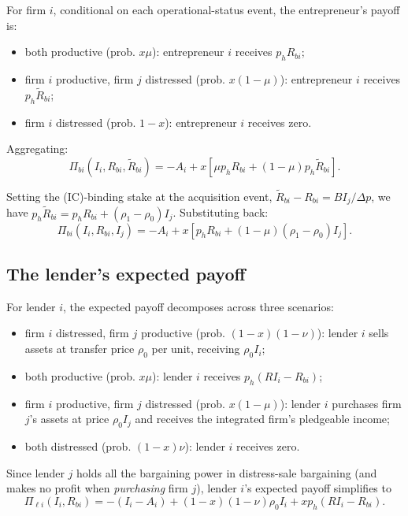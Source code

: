 \documentclass[11pt,a4paper,oneside]{book}
\theoremstyle{plain}
\theoremstyle{definition}
\theoremstyle{remark}
\numberwithin{equation}{chapter}
\begin{document}
For firm $i$, conditional on each operational-status event, the entrepreneur's payoff is:
\begin{itemize}
  \item both productive (prob. $x \mu$): entrepreneur $i$ receives $p_h R_{b i}$;
  \item firm $i$ productive, firm $j$ distressed (prob. $x(1 - \mu)$): entrepreneur $i$ receives $p_h \widetilde{R}_{b i}$;
  \item firm $i$ distressed (prob. $1 - x$): entrepreneur $i$ receives zero.
\end{itemize}
Aggregating:
\begin{equation}\label{eq:ma-Pi-b-raw}
  \Pi_{b i}(I_i, R_{b i}, \widetilde{R}_{b i}) = -A_i + x \left[\mu p_h R_{b i} + (1 - \mu) p_h \widetilde{R}_{b i}\right].
\end{equation}

Setting the (IC)-binding stake at the acquisition event, $\widetilde{R}_{b i} - R_{b i} = B I_j/\Delta p$, we have $p_h \widetilde{R}_{b i} = p_h R_{b i} + (\rho_1 - \rho_0) I_j$.
Substituting back:
\begin{equation}\label{eq:ma-Pi-b}
  \Pi_{b i}(I_i, R_{b i}, I_j) = -A_i + x \left[ p_h R_{b i} + (1 - \mu)(\rho_1 - \rho_0) I_j \right].
\end{equation}

\subsection{The lender's expected payoff}

For lender $i$, the expected payoff decomposes across three scenarios:
\begin{itemize}
  \item firm $i$ distressed, firm $j$ productive (prob. $(1 - x)(1 - \nu)$): lender $i$ sells assets at transfer price $\rho_0$ per unit, receiving $\rho_0 I_i$;
  \item both productive (prob. $x \mu$): lender $i$ receives $p_h(R I_i - R_{b i})$;
  \item firm $i$ productive, firm $j$ distressed (prob. $x(1 - \mu)$): lender $i$ purchases firm $j$'s assets at price $\rho_0 I_j$ and receives the integrated firm's pledgeable income;
  \item both distressed (prob. $(1 - x) \nu$): lender $i$ receives zero.
\end{itemize}

Since lender $j$ holds all the bargaining power in distress-sale bargaining (and makes no profit when \emph{purchasing} firm $j$), lender $i$'s expected payoff simplifies to
\begin{equation}\label{eq:ma-Pi-ell}
  \Pi_{\ell i}(I_i, R_{b i}) = -(I_i - A_i) + (1 - x)(1 - \nu) \rho_0 I_i + x p_h (R I_i - R_{b i}).
\end{equation}
\end{document}

